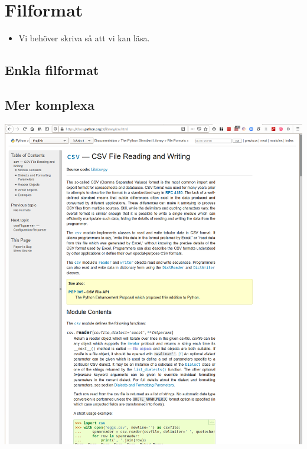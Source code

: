 \section{Filformat}

\begin{frame}[fragile]
  \begin{remark}
    \begin{itemize}
      \item Vi behöver skriva så att vi kan läsa.
    \end{itemize}
  \end{remark}
\end{frame}

\subsection{Enkla filformat}

\begin{frame}[fragile]
  \begin{example}[xy.py]
    
  \end{example}
\end{frame}

\begin{frame}[fragile]
  \begin{example}[xy.py]
    
  \end{example}
\end{frame}

\subsection{Mer komplexa}

\begin{frame}
  \includegraphics[width=\columnwidth]{figs/docs-csv.png}
\end{frame}

